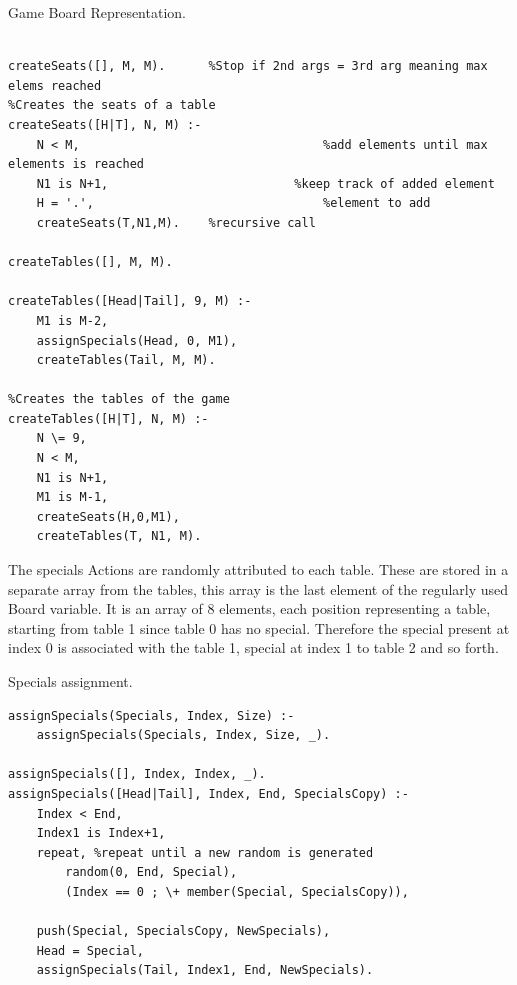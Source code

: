 \documentclass[a4paper]{article}
\begin{document}
\begin{listing}[H]
    \caption{Game Board Representation.}
    \label{Codigo:cod_board}
    \begin{verbatim}

createSeats([], M, M).      %Stop if 2nd args = 3rd arg meaning max elems reached
%Creates the seats of a table
createSeats([H|T], N, M) :-
    N < M,                                  %add elements until max elements is reached
    N1 is N+1,                          %keep track of added element
    H = '.',                                %element to add
    createSeats(T,N1,M).    %recursive call

createTables([], M, M).

createTables([Head|Tail], 9, M) :-
    M1 is M-2,
    assignSpecials(Head, 0, M1),
    createTables(Tail, M, M).

%Creates the tables of the game
createTables([H|T], N, M) :-
    N \= 9,
    N < M,
    N1 is N+1,
    M1 is M-1,
    createSeats(H,0,M1),
    createTables(T, N1, M).

\end{verbatim}

\end{listing}
\newpage
The specials Actions are randomly attributed to each table. These are stored in a separate array from the tables,
this array is the last element of the regularly used Board variable. It is an array of 8 elements, each position
representing a table, starting from table 1 since table 0 has no special. Therefore the special present at index 0
is associated with the table 1, special at index 1 to table 2 and so forth.

\renewcommand\listingscaption{Code}

\begin{listing}[H]
    \caption{Specials assignment.}
    \label{Codigo:cod_special}
    \begin{verbatim}
assignSpecials(Specials, Index, Size) :-
    assignSpecials(Specials, Index, Size, _).

assignSpecials([], Index, Index, _).
assignSpecials([Head|Tail], Index, End, SpecialsCopy) :-
    Index < End,
    Index1 is Index+1,
    repeat, %repeat until a new random is generated
        random(0, End, Special),
        (Index == 0 ; \+ member(Special, SpecialsCopy)),

    push(Special, SpecialsCopy, NewSpecials),
    Head = Special,
    assignSpecials(Tail, Index1, End, NewSpecials).

\end{verbatim}

\end{listing}
\end{document}
